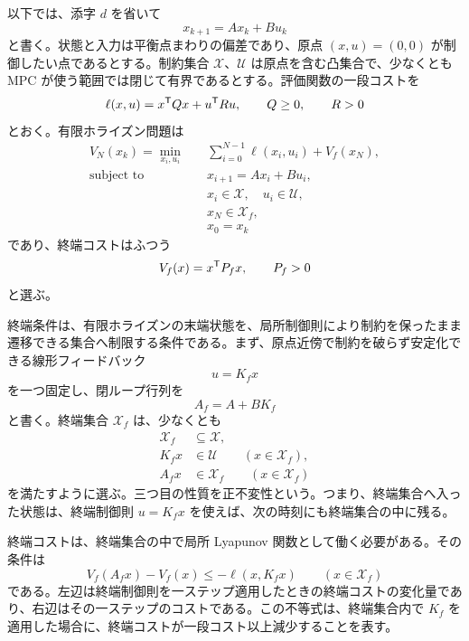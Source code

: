 以下では、添字 $d$ を省いて
\begin{equation}
  x_{k+1}=Ax_k+Bu_k
\end{equation}
と書く。状態と入力は平衡点まわりの偏差であり、原点 $(x,u)=(0,0)$ が制御したい点であるとする。制約集合 $\mathcal{X}$、$\mathcal{U}$ は原点を含む凸集合で、少なくとも MPC が使う範囲では閉じて有界であるとする。評価関数の一段コストを
\begin{equation}
  \ell(x,u)=x^{\mathsf{T}} Qx+u^{\mathsf{T}} Ru,
  \qquad Q\ge0,
  \qquad R>0
\end{equation}
とおく。有限ホライズン問題は
\begin{align}
  V_N(x_k)=\min_{x_i,u_i}\quad &
  \sum_{i=0}^{N-1}\ell(x_i,u_i)+V_f(x_N),\\
  \text{subject to}\quad &x_{i+1}=Ax_i+Bu_i,\\
  &x_i\in\mathcal{X},\quad u_i\in\mathcal{U},\\
  &x_N\in\mathcal{X}_f,\\
  &x_0=x_k
\end{align}
であり、終端コストはふつう
\begin{equation}
  V_f(x)=x^{\mathsf{T}} P_fx,
  \qquad P_f>0
\end{equation}
と選ぶ。

終端条件は、有限ホライズンの末端状態を、局所制御則により制約を保ったまま遷移できる集合へ制限する条件である。まず、原点近傍で制約を破らず安定化できる線形フィードバック
\begin{equation}
  u=K_fx
\end{equation}
を一つ固定し、閉ループ行列を
\begin{equation}
  A_f=A+BK_f
\end{equation}
と書く。終端集合 $\mathcal{X}_f$ は、少なくとも
\begin{align}
  \mathcal{X}_f&\subseteq\mathcal{X},\\
  K_fx&\in\mathcal{U}\qquad (x\in\mathcal{X}_f),\\
  A_fx&\in\mathcal{X}_f\qquad (x\in\mathcal{X}_f)
\end{align}
を満たすように選ぶ。三つ目の性質を正不変性という。つまり、終端集合へ入った状態は、終端制御則 $u=K_fx$ を使えば、次の時刻にも終端集合の中に残る。

終端コストは、終端集合の中で局所 Lyapunov 関数として働く必要がある。その条件は
\begin{equation}
  V_f(A_fx)-V_f(x)
  \le -\ell(x,K_fx)
  \qquad (x\in\mathcal{X}_f)
\end{equation}
である。左辺は終端制御則を一ステップ適用したときの終端コストの変化量であり、右辺はその一ステップのコストである。この不等式は、終端集合内で $K_f$ を適用した場合に、終端コストが一段コスト以上減少することを表す。

